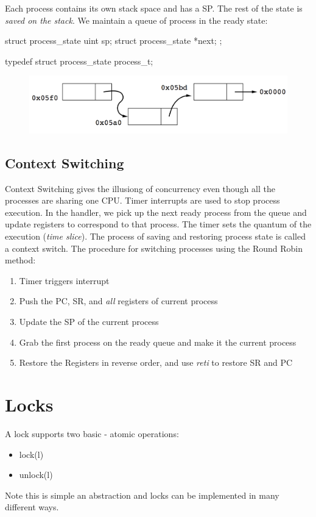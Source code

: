 \documentclass{hw}
\begin{document}
Each process contains its own stack space and has a SP. The rest of the state is
\emph{saved on the stack}. We maintain a queue of process in the ready state:
\begin{C}
struct process_state {
  uint sp;
  struct process_state *next;
};

typedef struct process_state process_t;
\end{C}

\begin{figure}[H]
  \centering
  \includegraphics[scale=.4]{queue}
\end{figure}

\subsection{Context Switching}
Context Switching gives the illusiong of concurrency even though
all the processes are sharing one CPU.
Timer interrupts are used to stop process execution. In the handler, we pick up
the next ready process from the queue and update registers to correspond to that
process. The timer sets the quantum of the execution (\emph{time slice}). The
process of saving and restoring process state is called a context switch.
The procedure for switching processes using the Round Robin method:

\begin{enumerate}
  \item Timer triggers interrupt
  \item Push the PC, SR, and \emph{all} registers of current process
  \item Update the SP of the current process 
  \item Grab the first process on the ready queue and make it the current process
  \item Restore the Registers in reverse order, and use \emph{reti} to restore
    SR and PC
\end{enumerate}


\section{Locks}
A lock supports two basic - atomic operations:
\begin{itemize}
  \item lock(l)
  \item unlock(l)
\end{itemize}
Note this is simple an abstraction and locks can be implemented in many 
different ways.
\end{document}
